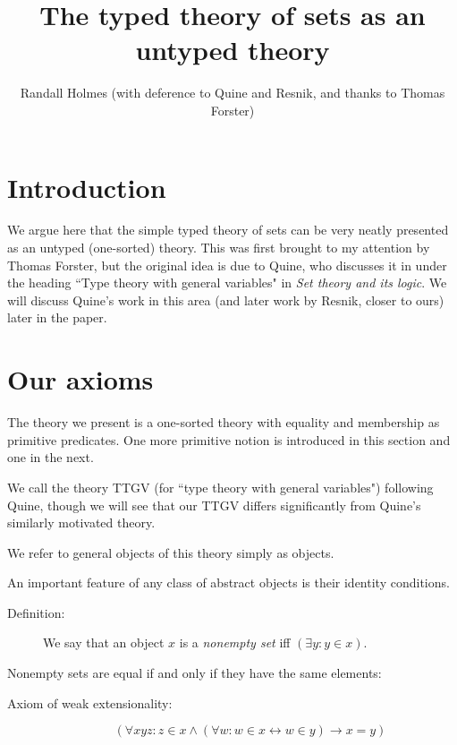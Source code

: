 \documentclass[12pt]{article}
\title{The typed theory of sets as an untyped theory}
\author{Randall Holmes (with deference to Quine and Resnik, and thanks to Thomas Forster)}
\begin{document}
\maketitle

\tableofcontents

\section{Introduction}

We argue here that the simple typed theory of sets can be very neatly presented as an untyped (one-sorted) theory.  This was first brought to my attention by Thomas Forster, but the original idea is due to Quine, who discusses it in under the heading ``Type theory with general variables" in {\em Set theory and its logic\/}.   We will discuss Quine's work in this area (and later work by Resnik, closer to ours) later in the paper.

\section{Our axioms}

The theory we present is a one-sorted theory with equality and membership as primitive predicates.  One more primitive notion is introduced in this section and one in the next.

We call the theory TTGV (for ``type theory with general variables") following Quine, though we will see that our TTGV differs significantly from Quine's similarly motivated theory.

We refer to general objects of this theory simply as objects.

An important feature of any class of abstract objects is their identity conditions.

\begin{description}

\item[Definition:]  We say that an object $x$ is a {\em nonempty set\/} iff $(\exists y:y \in x)$.

\end{description}

Nonempty sets are equal if and only if they have the same elements:

\begin{description}

\item[Axiom of weak extensionality:]  $$(\forall xyz:z \in x \wedge (\forall w:w \in x \leftrightarrow w \in y) \rightarrow x=y)$$

\end{description}
\end{document}
